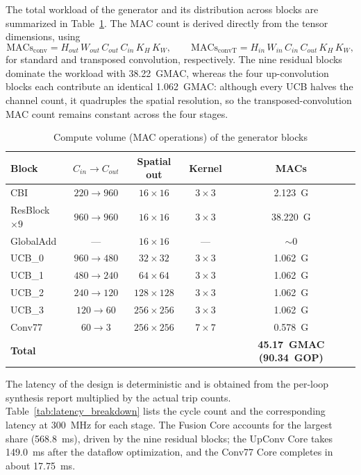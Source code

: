 The total workload of the generator and its distribution across blocks are summarized in Table~\ref{tab:compute_volume}. The MAC count is derived directly from the tensor dimensions, using
\[
\text{MACs}_{\text{conv}} = H_{out}\,W_{out}\,C_{out}\,C_{in}\,K_H\,K_W,
\qquad
\text{MACs}_{\text{convT}} = H_{in}\,W_{in}\,C_{in}\,C_{out}\,K_H\,K_W,
\]
for standard and transposed convolution, respectively. The nine residual blocks dominate the workload with 38.22~GMAC, whereas the four up-convolution blocks each contribute an identical 1.062~GMAC: although every UCB halves the channel count, it quadruples the spatial resolution, so the transposed-convolution MAC count remains constant across the four stages.

\begin{table}[H]
    \centering
    \caption{Compute volume (MAC operations) of the generator blocks}
    \label{tab:compute_volume}
    \small
    \renewcommand{\arraystretch}{1.2}
    \begin{tabular}{|l|c|c|c|c|}
        \hline
        \textbf{Block} & \textbf{$C_{in}\rightarrow C_{out}$} & \textbf{Spatial out} & \textbf{Kernel} & \textbf{MACs} \\
        \hline
        CBI & $220\rightarrow960$ & $16\times16$ & $3\times3$ & 2.123~G \\
        \hline
        ResBlock $\times 9$ & $960\rightarrow960$ & $16\times16$ & $3\times3$ & 38.220~G \\
        \hline
        GlobalAdd & --- & $16\times16$ & --- & $\sim0$ \\
        \hline
        UCB\_0 & $960\rightarrow480$ & $32\times32$ & $3\times3$ & 1.062~G \\
        \hline
        UCB\_1 & $480\rightarrow240$ & $64\times64$ & $3\times3$ & 1.062~G \\
        \hline
        UCB\_2 & $240\rightarrow120$ & $128\times128$ & $3\times3$ & 1.062~G \\
        \hline
        UCB\_3 & $120\rightarrow60$ & $256\times256$ & $3\times3$ & 1.062~G \\
        \hline
        Conv77 & $60\rightarrow3$ & $256\times256$ & $7\times7$ & 0.578~G \\
        \hline
        \textbf{Total} & & & & \textbf{45.17~GMAC (90.34~GOP)} \\
        \hline
    \end{tabular}
\end{table}

The latency of the design is deterministic and is obtained from the per-loop synthesis report multiplied by the actual trip counts. Table~\ref{tab:latency_breakdown} lists the cycle count and the corresponding latency at 300~MHz for each stage. The Fusion Core accounts for the largest share (568.8~ms), driven by the nine residual blocks; the UpConv Core takes 149.0~ms after the dataflow optimization, and the Conv77 Core completes in about 17.75~ms.

